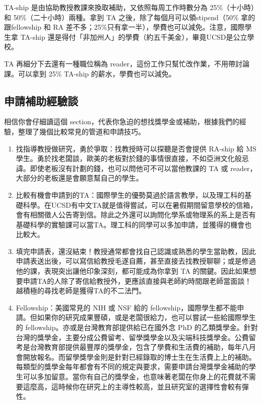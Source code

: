 \documentclass[10pt,a4paper]{book}
\begin{document}
\begin{CJK}{UTF8}{bkai}
TA-ship 是由協助教授教課來換取補助，又依照每周工作時數分為 25\%（十小時）和 50\%（二十小時）兩種。拿到 TA 之後，除了每個月可以領stipend（50\% 拿的跟fellowship 和 RA 差不多；25\%只有拿一半），學費也可以減免。注意，國際學生拿 TA-ship 還是得付「非加州人」的學費（約五千美金），畢竟UCSD是公立學校。

TA 再細分下去還有一種職位稱為 reader，這份工作只幫忙改作業，不用帶討論課。可以拿到 25\% TA-ship 的薪水，學費也可以減免。

\subsection{申請補助經驗談}
相信你會仔細讀這個 section，代表你急迫的想找獎學金或補助，根據我們的經驗，整理了幾個比較常見的管道和申請技巧。

\begin{enumerate}
\item 找指導教授做研究，勇於爭取：找教授時可以探聽是否會提供 RA-ship 給 MS 學生。勇於找老闆談，歐美的老板對於錢的事情很直接，不如亞洲文化般忌諱。即使老板沒有計劃的錢，也可以問他可不可以當他教課的 TA 或 reader，大部分的老板還是會願意幫自己的學生。

\item 比較有機會申請到的TA：國際學生的優勢莫過於語言教學，以及理工科的基礎科學。在UCSD有中文TA就是值得嘗試，可以在暑假期間留意學校的信箱，會有相關徵人公告寄到信。除此之外還可以詢問化學系或物理系的系上是否有基礎科學的實驗課可以當TA。理工科的同學可以多加申請，並獲得的機會也比較大。

\item 填完申請表，還沒結束！教授通常都會找自己認識或熟悉的學生當助教，因此申請表送出後，可以寫信給教授毛遂自薦，甚至直接去找教授聊聊；或是修過他的課，表現突出讓他印象深刻，都可能成為你拿到 TA 的關鍵。因此如果想要申請TA的人除了寄信給教授外，更應該直接與老師約時間跟老師當面談！越積極的尋找老師是獲得TA的不二法門。

\item Fellowship：美國常見的 NIH 或 NSF 給的 fellowship，國際學生都不能申請。但如果你的研究成果豐碩，或是老闆很給力，也可以嘗試一些給國際學生的 fellowship。亦或是台灣教育部提供給已在國外念 PhD 的乙類獎學金。針對台灣的獎學金，主要分成公費留考、留學獎學金以及尖端科技獎學金。公費留考是台灣教育部提供最豐厚的獎學金，包含了學費和生活費的補助，每年八月會開放報名。而留學獎學金則是針對已經錄取的博士生在生活費上上的補助。每類型的獎學金每年都會有不同的規定與要求，需要申請台灣獎學金補助的學生可以多加留意。當你有自己的獎學金，也意味著老闆在你身上的花費就不需要這麼高，這時候你在研究上的主導性較高，並且研究室的選擇性會較有彈性。 
\end{enumerate}


\end{CJK}
\end{document}
